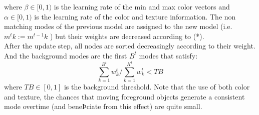 \documentclass[10pt,letterpaper]{article}
\begin{document}
where $\beta \in [0,1)$ is the learning rate of the min and max color vectors and $\alpha \in [0,1)$ is the learning rate of the color and texture information. The non matching modes of the previous model are assigned to the new model (i.e. $m^{t}{k}:=m^{t-1}{k}$ ) but their weights are decreased according to (*).
\\
After the update step, all nodes are sorted decreasingly according to their weight. And the background modes are the first $B^{t}$ modes that satisfy:
\begin {equation}\sum_{k=1}^{B^{t}} w_{k}^{t} / \sum_{k=1}^{K^{t}} w_{k}^{t} < TB \end{equation} where $TB  \in [0,1]$ is the background threshold.
Note that the use of both color and texture, the chances that moving foreground objects generate a consistent mode overtime (and beneÞciate from this effect) are quite small.\\
\end{document}
